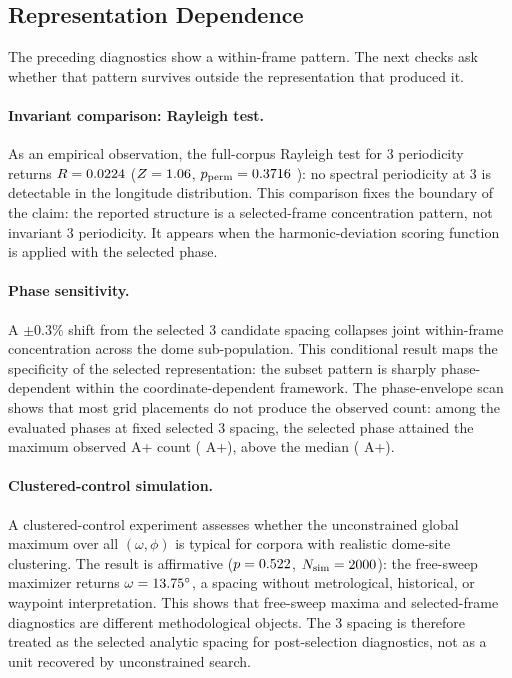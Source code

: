 \documentclass[12pt,a4paper]{article}
\newcommand{\degr}{\ifmmode{^\circ}\else\textdegree{}\fi}
\begin{document}
\subsection{Representation Dependence}
\label{sec:repn_dependence}

The preceding diagnostics show a within-frame pattern. The next checks ask
whether that pattern survives outside the representation that produced it.

\paragraph{Invariant comparison: Rayleigh test.}
As an empirical observation, the full-corpus Rayleigh test for
3\textdegree{} periodicity returns
$R = 0.0224$ ($Z = 1.06$,
$p_{\mathrm{perm}} = 0.3716$ \fullRayleighPermPSig{}): no
spectral periodicity at 3\textdegree{} is detectable in the longitude
distribution. This comparison fixes the boundary of the claim: the reported
structure is a selected-frame concentration pattern, not invariant
3\textdegree{} periodicity. It appears when the harmonic-deviation scoring
function is applied with the selected phase.

\paragraph{Phase sensitivity.}
A $\pm 0.3\%$ shift from the selected 3\textdegree{} candidate spacing
collapses joint within-frame concentration across the dome sub-population.
This conditional result maps the specificity of the selected representation: the subset
pattern is sharply phase-dependent within the coordinate-dependent
framework. The phase-envelope scan shows that most grid placements do not
produce the observed count: among the \phaseNphases{} evaluated phases at
fixed selected 3\textdegree{} spacing, the selected phase attained the
maximum observed A+ count (\phaseFullGerCount{} A+), above the median
(\phaseFullMedian{} A+).

\paragraph{Clustered-control simulation.}
A clustered-control experiment assesses whether the unconstrained global
maximum over all $(\omega, \phi)$ is typical for corpora with realistic
dome-site clustering. The result is affirmative ($p = 0.522$,
$N_{\mathrm{sim}} = 2000$): the free-sweep maximizer returns
$\omega = \clusterCtrlObsOmega\degr{}$, a spacing without metrological,
historical, or waypoint interpretation. This shows that free-sweep maxima and
selected-frame diagnostics are different methodological objects. The
3\degr{} spacing is therefore treated as the selected analytic spacing for
post-selection diagnostics, not as a unit recovered by unconstrained search.
\end{document}
